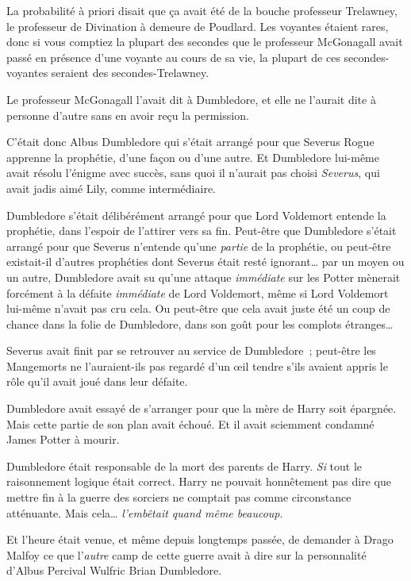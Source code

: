 La probabilité à priori disait que ça avait été de la bouche professeur Trelawney, le professeur de Divination à demeure de Poudlard. Les voyantes étaient rares, donc si vous comptiez la plupart des secondes que le professeur McGonagall avait passé en présence d'une voyante au cours de sa vie, la plupart de ces secondes-voyantes seraient des secondes-Trelawney.

Le professeur McGonagall l'avait dit à Dumbledore, et elle ne l'aurait dite à personne d'autre sans en avoir reçu la permission.

C'était donc Albus Dumbledore qui s'était arrangé pour que Severus Rogue apprenne la prophétie, d'une façon ou d'une autre. Et Dumbledore lui-même avait résolu l'énigme avec succès, sans quoi il n'aurait pas choisi \emph{Severus}, qui avait jadis aimé Lily, comme intermédiaire.

Dumbledore s'était délibérément arrangé pour que Lord Voldemort entende la prophétie, dans l'espoir de l'attirer vers sa fin. Peut-être que Dumbledore s'était arrangé pour que Severus n'entende qu'une \emph{partie} de la prophétie, ou peut-être existait-il d'autres prophéties dont Severus était resté ignorant… par un moyen ou un autre, Dumbledore avait su qu'une attaque \emph{immédiate} sur les Potter mènerait forcément à la défaite \emph{immédiate} de Lord Voldemort, même si Lord Voldemort lui-même n'avait pas cru cela. Ou peut-être que cela avait juste été un coup de chance dans la folie de Dumbledore, dans son goût pour les complots étranges…

Severus avait finit par se retrouver au service de Dumbledore~; peut-être les Mangemorts ne l'auraient-ils pas regardé d'un œil tendre s'ils avaient appris le rôle qu'il avait joué dans leur défaite.

Dumbledore avait essayé de s'arranger pour que la mère de Harry soit épargnée. Mais cette partie de son plan avait échoué. Et il avait sciemment condamné James Potter à mourir.

Dumbledore était responsable de la mort des parents de Harry. \emph{Si} tout le raisonnement logique était correct. Harry ne pouvait honnêtement pas dire que mettre fin à la guerre des sorciers ne comptait pas comme circonstance atténuante. Mais cela… \emph{l'embêtait quand même beaucoup}.

Et l'heure était venue, et même depuis longtemps passée, de demander à Drago Malfoy ce que l'\emph{autre} camp de cette guerre avait à dire sur la personnalité d'Albus Percival Wulfric Brian Dumbledore. 

